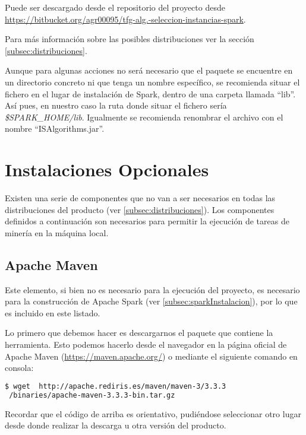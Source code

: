 Puede ser descargado desde el repositorio del proyecto desde \url{https://bitbucket.org/agr00095/tfg-alg.-seleccion-instancias-spark}.

Para más información sobre las posibles distribuciones ver la sección \ref{subsec:distribuciones}.

Aunque para algunas acciones no será necesario que el paquete se encuentre en un directorio concreto ni que tenga un nombre específico, se recomienda situar el fichero en el lugar de instalación de Spark, dentro de una carpeta llamada ``lib''. Así pues, en nuestro caso la ruta donde situar el fichero sería \textit{\$SPARK\_HOME/lib}. Igualmente se recomienda renombrar el archivo con el nombre ``ISAlgorithms.jar''.



\section{Instalaciones Opcionales}\label{sec:InstalacionOpcional}

Existen una serie de componentes que no van a ser necesarios en todas las distribuciones del producto (ver \ref{subsec:distribuciones}). Los componentes definidos a continuación son necesarios para permitir la ejecución de tareas de minería en la máquina local.

\subsection{Apache Maven}

Este elemento, si bien no es necesario para la ejecución del proyecto, es necesario para la construcción de Apache Spark (ver \ref{subsec:sparkInstalacion}), por lo que es incluido en este listado.

Lo primero que debemos hacer es descargarnos el paquete que contiene la herramienta. Esto podemos hacerlo desde el navegador en la página oficial de Apache Maven (\url{https://maven.apache.org/}) o mediante el siguiente comando en consola:

\begin{lstlisting}[language=bash]
$ wget  http://apache.rediris.es/maven/maven-3/3.3.3
 /binaries/apache-maven-3.3.3-bin.tar.gz
\end{lstlisting}

Recordar que el código de arriba es orientativo, pudiéndose seleccionar otro lugar desde donde realizar la descarga u otra versión del producto.

